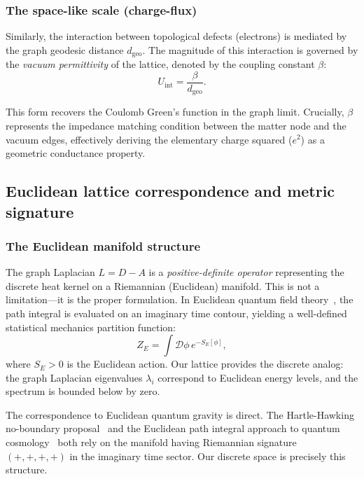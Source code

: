 \documentclass[aps,prd,twocolumn,superscriptaddress,groupedaddress,showpacs]{revtex4-2}
\begin{document}
\subsubsection{The space-like scale (charge-flux)}

Similarly, the interaction between topological defects (electrons) is mediated by the graph geodesic distance $d_{\text{geo}}$. The magnitude of this interaction is governed by the \emph{vacuum permittivity} of the lattice, denoted by the coupling constant $\beta$:
\begin{equation}
U_{\text{int}} = \frac{\beta}{d_{\text{geo}}}.
\end{equation}

This form recovers the Coulomb Green's function in the graph limit. Crucially, $\beta$ represents the impedance matching condition between the matter node and the vacuum edges, effectively deriving the elementary charge squared ($e^2$) as a geometric conductance property.

\subsection{Euclidean lattice correspondence and metric signature}

\subsubsection{The Euclidean manifold structure}

The graph Laplacian $L = D - A$ is a \emph{positive-definite operator} representing the discrete heat kernel on a Riemannian (Euclidean) manifold. This is not a limitation---it is the proper formulation. In Euclidean quantum field theory~\cite{Parisi1983}, the path integral is evaluated on an imaginary time contour, yielding a well-defined statistical mechanics partition function:
\begin{equation}
Z_E = \int \mathcal{D}\phi \, e^{-S_E[\phi]},
\end{equation}
where $S_E > 0$ is the Euclidean action. Our lattice provides the discrete analog: the graph Laplacian eigenvalues $\lambda_i$ correspond to Euclidean energy levels, and the spectrum is bounded below by zero.

The correspondence to Euclidean quantum gravity is direct. The Hartle-Hawking no-boundary proposal~\cite{Hartle1983} and the Euclidean path integral approach to quantum cosmology~\cite{Hawking1979} both rely on the manifold having Riemannian signature $(+,+,+,+)$ in the imaginary time sector. Our discrete space is precisely this structure.
\end{document}

